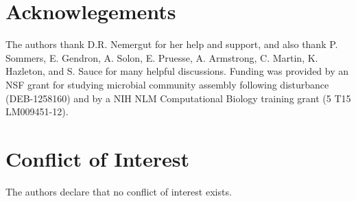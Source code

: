 \documentclass{article}
\begin{document}
\section{Acknowlegements}
The authors thank D.R. Nemergut for her help and support, and also thank P. Sommers, E. Gendron, A. Solon, E. Pruesse, A. Armstrong, C. Martin, K. Hazleton, and S. Sauce for many helpful discussions. Funding was provided by an NSF grant for studying microbial community assembly following disturbance (DEB-1258160) and by a NIH NLM Computational Biology training grant (5 T15 LM009451-12).

\section{Conflict of Interest}
The authors declare that no conflict of interest exists.



\newpage
\end{document}
